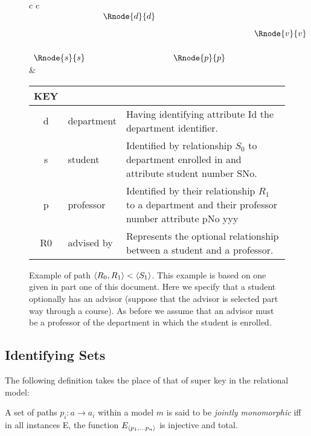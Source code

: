 \documentclass[10pt,a4paper]{article}
\newcommand{\genericmodel}{\mathcal{M}}
\renewcommand{\genericmodel}{{m}}
\newcommand{\term}[1]{\textit{{#1}}}
\newcommand{\ntuple}[1]{\tuple{#1_1,...#1_n}}
\newcommand {\pntuple}{\ensuremath{\ntuple{p}}}
\begin{document}
\begin{figure} [h]  %
\begin{center}
\begin{tabular}{c c}
$
\begin{array}{cp{0.05cm}c  p{0.05cm}c p{0.5cm}c}
                & & \Rnode{d}{d} & &              & &             \\ [0.3cm]
								& &              & &              & & \Rnode{v}{v} \\ [0.6cm]     
	 \Rnode{s}{s} & &              & & \Rnode{p}{p} & &             
\end{array}
$
\idcomp
{} 
\idcomp
{} 
\idcomp
{} 
\idcomp
{} 
\idcomp
& \footnotesize
\begin{tabular}{c p{1.5cm} p{4cm}}
KEY && \\
\hline
d & department & Having identifying attribute Id the department identifier. \\
s & student & Identified by relationship $S_0$ to department enrolled in and  attribute student number SNo. \\
p & professor & Identified by their relationship $R_1$ to a department and their professor number attribute pNo yyy \\
R0 & advised by & Represents the optional relationship between a student and a professor.\\
\end{tabular} 
\end{tabular}
\end{center}
\caption{Example of path  $\langle R_0,R_1\rangle < \langle S_1\rangle$. This example is based on one given in part one of this document. Here we specify that a student optionally has an advisor (suppose that the advisor is selected part way through a course). As before we assume that an advisor must be a professor of the department in which the student is enrolled. }
\label{studentadvisorgraph}
\end{figure}


 


\subsection{Identifying Sets}

The following definition takes the place of that of super key in the relational model:
\begin{definition}
A set of paths $p_i: a \rightarrow a_i$ within a model $\genericmodel$ is said to be \term{jointly monomorphic} iff in all instances E, the  function $E_{\pntuple}$  is  injective and total.
\end{definition}
\end{document}
